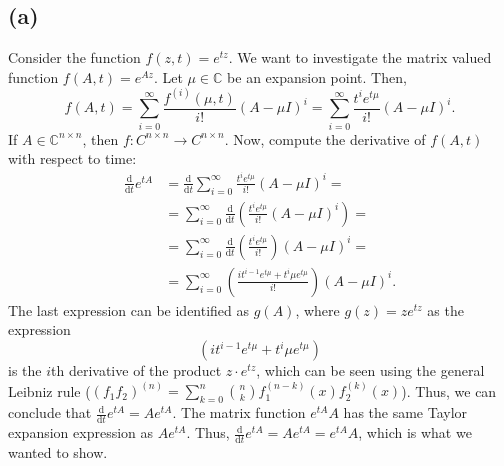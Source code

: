 \subsection*{(a)}


Consider the function $f(z,t) = e^{tz}$. We want to investigate the matrix valued function $f(A,t) = e^{Az}$. Let $\mu \in \mathbb{C}$ be an expansion point. Then,
\begin{equation}
  f(A,t) = \sum\limits_{i = 0}^{\infty} \frac{f^{(i)}(\mu,t)}{i!}(A-\mu I)^{i} = \sum\limits_{i = 0}^{\infty} \frac{t^ie^{t\mu}}{i!}(A-\mu I)^{i}.
\end{equation}
If $A\in\mathbb{C}^{n\times n}$, then $f:C^{n \times n}\rightarrow C^{n \times n}$. Now, compute the derivative of $f(A,t)$ with respect to time:
\begin{equation}
\begin{aligned}
\frac{\mathrm d}{\mathrm d t}e^{tA} & = \frac{\mathrm d}{\mathrm dt}\sum^{\infty}_{i = 0} \frac{t^ie^{t\mu}}{i!}(A-\mu I )^i = \\
& = \sum^{\infty}_{i = 0} \frac{\mathrm d}{\mathrm dt}\left(\frac{t^ie^{t\mu}}{i!}(A-\mu I )^i\right) = \\
& = \sum^{\infty}_{i = 0} \frac{\mathrm d}{\mathrm dt}\left(\frac{t^ie^{t\mu}}{i!}\right)(A-\mu I )^i  = \\
&= \sum^{\infty}_{i = 0}  \left(\frac{it^{i-1}e^{t\mu}+t^i\mu e^{t\mu}}{i!}\right) (A-\mu I )^i.
\end{aligned}
\end{equation}
The last expression can be identified as $g(A)$, where $g(z) = ze^{tz}$ as  the expression
\begin{equation}
\left(it^{i-1}e^{t\mu}+t^i\mu e^{t\mu}\right)
\end{equation}
is the $i$th derivative of the product $z\cdot e^{tz}$, which can be seen using the general Leibniz rule ($(f_1f_2)^{(n)} = \sum_{k = 0}^n\binom{n}{k}f_1^{(n-k)}(x)f_2^{(k)}(x)$). Thus, we can conclude that $\frac{\mathrm d }{\mathrm dt}e^{tA} = Ae^{tA}$. The matrix function $e^{tA}A$ has the same Taylor expansion expression as $Ae^{tA}$. Thus, $\frac{\mathrm d }{\mathrm dt}e^{tA} = Ae^{tA} = e^{tA} A$, which is what we wanted to show.


